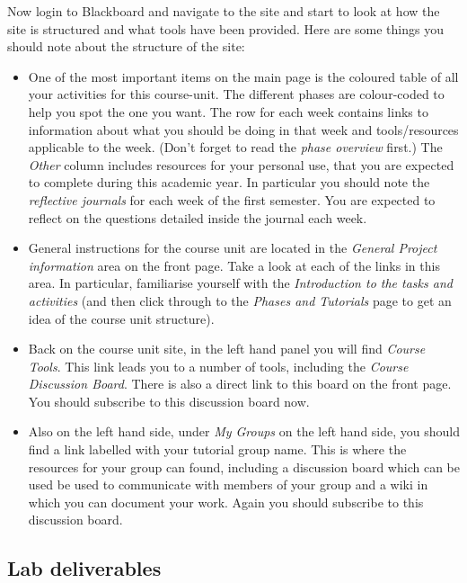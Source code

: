 \begin{firstonly}
Now login to Blackboard and navigate to the  site and start to look at how the site is structured and what tools have been provided.
Here are some things you should note about the structure of the site:


\begin{itemize}

\item One of the most important items on the main page is the coloured
table of all your activities for this course-unit. The different
phases are colour-coded to help you spot the one you want. The row for
each week contains links to information about what you should be doing
in that week and tools/resources applicable to the week. (Don't forget
to read the \emph{phase overview} first.) The \emph{Other} column
includes resources for your personal use, that you are expected to
complete during this academic year. In particular you should note the
\emph{reflective journals} for each week of the first semester. You
are expected to reflect on the questions detailed inside the journal
each week.

\item General instructions for the course unit are located in the
\emph{General Project information} area on the front page. Take a look
at each of the links in this area. In particular, familiarise yourself
with the \emph{Introduction to the tasks and activities} (and then
click through to the \emph{Phases and Tutorials} page to get an idea
of the course unit structure).

\item Back on the course unit site, in the left hand panel you will
find \emph{Course Tools}. This link leads you to a number of tools,
including the \emph{Course Discussion Board}. There is also a direct
link to this board on the front page. You should subscribe to this
discussion board now.

\item Also on the left hand side, under \emph{My Groups} on the left
hand side, you should find a link labelled with your tutorial group
name. This is where the resources for your group can found, including
a discussion board which can be used be used to communicate with
members of your group and a wiki in which you can document your
work. Again you should subscribe to this discussion board.

\end{itemize}

\subsection{Lab deliverables}
\label{sec:lab-deliverables}


\end{firstonly}

